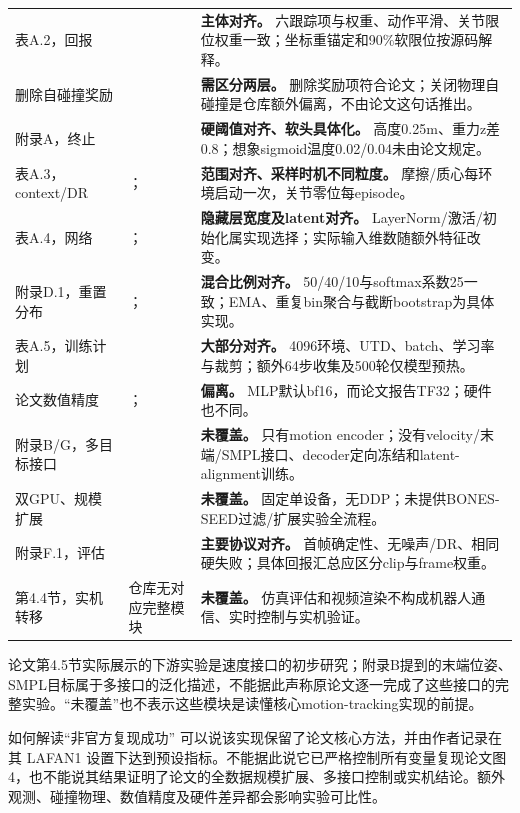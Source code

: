 \begin{longtable}{@{}P{30mm}P{45mm}P{79mm}@{}}
表A.2，回报 &  & \textbf{主体对齐。} 六跟踪项与权重、动作平滑、关节限位权重一致；坐标重锚定和90\%软限位按源码解释。\\
删除自碰撞奖励 &  & \textbf{需区分两层。} 删除奖励项符合论文；关闭物理自碰撞是仓库额外偏离，不由论文这句话推出。\\
附录A，终止 &  & \textbf{硬阈值对齐、软头具体化。} 高度0.25m、重力z差0.8；想象sigmoid温度0.02/0.04未由论文规定。\\
表A.3，context/DR & ； & \textbf{范围对齐、采样时机不同粒度。} 摩擦/质心每环境启动一次，关节零位每episode。\\
表A.4，网络 & ； & \textbf{隐藏层宽度及latent对齐。} LayerNorm/激活/初始化属实现选择；实际输入维数随额外特征改变。\\
附录D.1，重置分布 & ； & \textbf{混合比例对齐。} 50/40/10与softmax系数25一致；EMA、重复bin聚合与截断bootstrap为具体实现。\\
表A.5，训练计划 &  & \textbf{大部分对齐。} 4096环境、UTD、batch、学习率与裁剪；额外64步收集及500轮仅模型预热。\\
论文数值精度 & ； & \textbf{偏离。} MLP默认bf16，而论文报告TF32；硬件也不同。\\
附录B/G，多目标接口 &  & \textbf{未覆盖。} 只有motion encoder；没有velocity/末端/SMPL接口、decoder定向冻结和latent-alignment训练。\\
双GPU、规模扩展 &  & \textbf{未覆盖。} 固定单设备，无DDP；未提供BONES-SEED过滤/扩展实验全流程。\\
附录F.1，评估 &  & \textbf{主要协议对齐。} 首帧确定性、无噪声/DR、相同硬失败；具体回报汇总应区分clip与frame权重。\\
第4.4节，实机转移 & 仓库无对应完整模块 & \textbf{未覆盖。} 仿真评估和视频渲染不构成机器人通信、实时控制与实机验证。\\
\bottomrule
\end{longtable}
\normalsize

论文第4.5节实际展示的下游实验是速度接口的初步研究；附录B提到的末端位姿、SMPL目标属于多接口的泛化描述，不能据此声称原论文逐一完成了这些接口的完整实验。“未覆盖”也不表示这些模块是读懂核心motion-tracking实现的前提。

\begin{caution}{如何解读“非官方复现成功”}
可以说该实现保留了论文核心方法，并由作者记录在其 LAFAN1 设置下达到预设指标。不能据此说它已严格控制所有变量复现论文图4，也不能说其结果证明了论文的全数据规模扩展、多接口控制或实机结论。额外观测、碰撞物理、数值精度及硬件差异都会影响实验可比性。
\end{caution}
